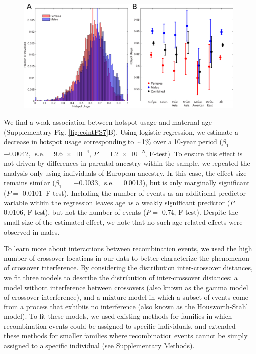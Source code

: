\begin{figure}[h]
    \includegraphics[width=\textwidth]{cointEscape/figs/Figure2.png}
    \vspace{-20pt}
\end{figure}

We find a weak association between hotspot usage and
maternal age (Supplementary Fig. \ref{fig:cointFS7}B). Using logistic regression,
we estimate a decrease in hotspot usage corresponding to
$\sim$1\% over a 10-year period ($\beta_1=$ \num{-0.0042}, $\text{s.e.}=$ \num{9.6e-4}, 
$P=$ \num{1.2e-5}, F-test). To ensure this effect is not driven by
differences in parental ancestry within the sample, we repeated
the analysis only using individuals of European ancestry. In this
case, the effect size remains similar ($\beta_1=$ \num{-0.0033}, $\text{s.e.}=$ 0.0013),
but is only marginally significant ($P=$ 0.0101, F-test). Including
the number of events as an additional predictor variable within
the regression leaves age as a weakly significant predictor
($P=$ 0.0106, F-test), but not the number of events ($P=$ 0.74,
F-test). Despite the small size of the estimated effect, we note that
no such age-related effects were observed in males.

To learn more about interactions between recombination
events, we used the high number of crossover locations in our
data to better characterize the phenomenon of crossover
interference. By considering the distribution inter-crossover
distances, we fit three models to describe the distribution of
inter-crossover distances: a model without interference between
crossovers (also known as the gamma model of crossover
interference\cite{Broman2000}), and a mixture model in which a subset of
events come from a process that exhibits no interference (also
known as the Housworth-Stahl model\cite{Housworth2003}). To fit these models, we
used existing methods for families in which recombination events
could be assigned to specific individuals, and extended these
methods for smaller families where recombination events cannot
be simply assigned to a specific individual (see Supplementary
Methods).

